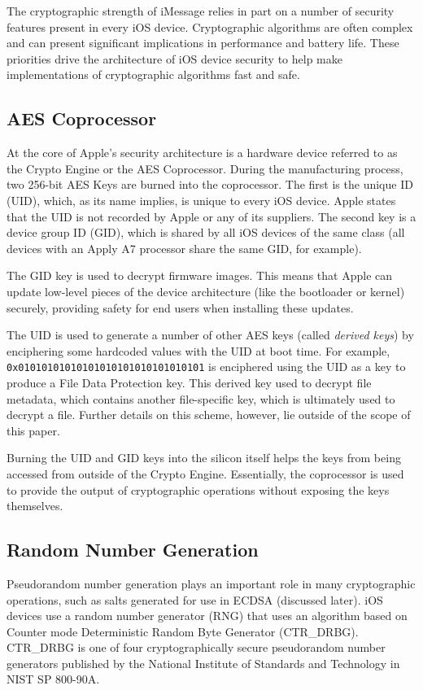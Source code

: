 The cryptographic strength of iMessage relies in part on a number of security
features present in every iOS device. Cryptographic algorithms are often
complex and can present significant implications in performance and battery
life.  These priorities drive the architecture of iOS device security to help
make implementations of cryptographic algorithms fast and safe.

\subsection{AES Coprocessor}
At the core of Apple's security architecture is a hardware device referred to
as the Crypto Engine or the AES Coprocessor. During the manufacturing process,
two 256-bit AES Keys are burned into the coprocessor. The first is the unique
ID (UID), which, as its name implies, is unique to every iOS device. Apple
states that the UID is not recorded by Apple or any of its
suppliers\cite{apple}. The second key is a device group ID (GID), which is
shared by all iOS devices of the same class (all devices with an Apply A7
processor share the same GID, for example).

The GID key is used to decrypt firmware images. This means that Apple can
update low-level pieces of the device architecture (like the bootloader or
kernel) securely, providing safety for end users when installing these updates.

The UID is used to generate a number of other AES keys (called \textit{derived
keys}) by enciphering some hardcoded values with the UID at boot time. For
example, \texttt{0x01010101010101010101010101010101} is enciphered using the
UID as a key to produce a File Data Protection key. This derived key used to
decrypt file metadata, which contains another file-specific key, which is
ultimately used to decrypt a file. Further details on this scheme, however, lie
outside of the scope of this paper.

Burning the UID and GID keys into the silicon itself helps the keys from being
accessed from outside of the Crypto Engine. Essentially, the coprocessor is
used to provide the output of cryptographic operations without exposing the
keys themselves.

\subsection{Random Number Generation}
Pseudorandom number generation plays an important role in many cryptographic
operations, such as salts generated for use in ECDSA (discussed later). iOS
devices use a random number generator (RNG) that uses an algorithm based on
Counter mode Deterministic Random Byte Generator (CTR\_DRBG).  CTR\_DRBG is one
of four cryptographically secure pseudorandom number generators published by
the National Institute of Standards and Technology in NIST SP
800-90A\cite{nistsp80090a}.

